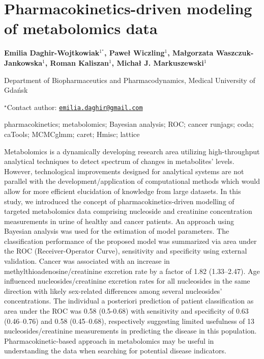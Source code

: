 \documentclass[\main/boa.tex]{subfiles}
\begin{document}
\section{Pharmacokinetics-driven modeling of metabolomics data}

\begin{center}
  {\bf Emilia Daghir-Wojtkowiak$^{1^\star}$, Paweł Wiczling$^{1}$, Małgorzata Waszczuk-Jankowska$^{1}$, Roman Kaliszan$^{1}$, Michał J. Markuszewski$^{1}$}
\end{center}

\vskip 0.3cm

\begin{affiliations}
\begin{enumerate}
\begin{minipage}{0.915\textwidth}
\centering
\item Department of Biopharmaceutics and Pharmacodynamics, Medical University
of Gdańsk \\[-2pt]
\end{minipage}
\end{enumerate}
$^\star$Contact author: \href{mailto:emilia.daghir@gmail.com}{\nolinkurl{emilia.daghir@gmail.com}}\\
\end{affiliations}

\vskip 0.5cm

\begin{minipage}{0.915\textwidth}
\keywords pharmacokinetics; metabolomics; Bayesian analysis; ROC; cancer
\packages runjags; coda; caTools; MCMCglmm; caret; Hmisc; lattice
\end{minipage}

\vskip 0.8cm

Metabolomics is a dynamically developing research area utilizing
high-throughput analytical techniques to detect spectrum of changes in
metabolites' levels. However, technological improvements designed for
analytical systems are not parallel with the development/application of
computational methods which would allow for more efficient elucidation
of knowledge from large datasets. In this study, we introduced the
concept of pharmacokinetics-driven modelling of targeted metabolomics
data comprising nucleoside and creatinine concentration measurements in
urine of healthy and cancer patients. An approach using Bayesian
analysis was used for the estimation of model parameters. The
classification performance of the proposed model was summarized via area
under the ROC (Receiver-Operator Curve), sensitivity and specificity
using external validation. Cancer was associated with an increase in
methylthioadenosine/creatinine excretion rate by a factor of 1.82
(1.33--2.47). Age influenced nucleosides/creatinine excretion rates for
all nucleosides in the same direction with likely sex-related
differences among several nucleosides' concentrations. The individual a
posteriori prediction of patient classification as area under the ROC
was 0.58 (0.5-0.68) with sensitivity and specificity of 0.63
(0.46--0.76) and 0.58 (0.45--0.68), respectively suggesting limited
usefulness of 13 nucleosides/creatinine measurements in predicting the
disease in this population. Pharmacokinetic-based approach in
metabolomics may be useful in understanding the data when searching for
potential disease indicators.
\end{document}
